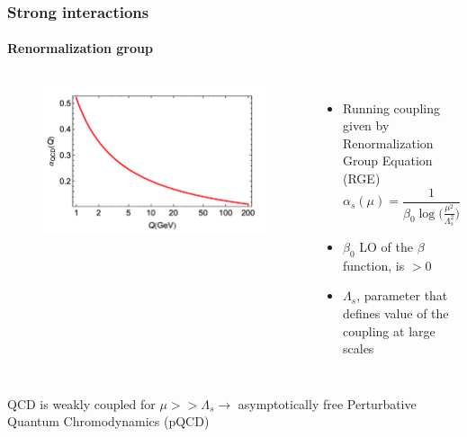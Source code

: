 \documentclass[aspectratio=43]{beamer}
\begin{document}
\begin{frame}

	\frametitle{Strong interactions}
	\framesubtitle{Renormalization group}

	\begin{columns}	
	
		
		\begin{figure}
			\includegraphics[width = 5 cm]{plots/qcd_coupling.png}
		\end{figure}

	
		\begin{itemize}
			\item \footnotesize Running coupling given by Renormalization Group Equation (RGE)
			\begin{equation}
				\alpha_{s}(\mu) = \frac{1}{\beta_{0} \log\big( \frac{\mu^{2}}{\Lambda_{s}^{2}}\big)} \nonumber
			\end{equation}
			\item \footnotesize $\beta_{0}$ LO of the $\beta$ function, is $ > 0$
			\item \footnotesize $\Lambda_{s}$, parameter that defines value of the coupling at large scales
		\end{itemize}

	\end{columns}
	
	\vspace{1cm}
	\center QCD is weakly coupled for $\mu >> \Lambda_{s} \longrightarrow$ asymptotically free
	\center \color{red} Perturbative Quantum Chromodynamics (pQCD)

\end{frame}
\end{document}
